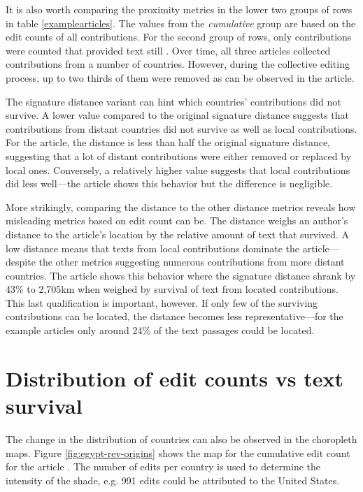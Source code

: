 It is also worth comparing the proximity metrics in the lower two groups of rows in table \ref{examplearticles}.
The values from the \emph{cumulative} group are based on the edit counts of all contributions.
For the second group of rows, only contributions were counted that provided text still .
Over time, all three articles collected contributions from a number of countries. 
However, during the collective editing process, up to two thirds of them were removed as can be observed in the  article. 

The signature distance variant  can hint which countries' contributions did not survive.
A lower  value compared to the original signature distance suggests that contributions from distant countries did not survive as well as local contributions.
For the  article, the  distance is less than half the original signature distance, suggesting that a lot of distant contributions were either removed or replaced by local ones.
Conversely, a relatively higher  value suggests that local contributions did less well---the article  shows this behavior but the difference is negligible.

More strikingly, comparing the  distance to the other distance metrics reveals how misleading metrics based on edit count can be.
The  distance weighs an author's distance to the article's location by the relative amount of text that survived.
A low  distance means that texts from local contributions dominate the article---despite the other metrics suggesting numerous contributions from more distant countries.
The  article shows this behavior where the signature distance shrank by 43\% to 2,705km when weighed by survival of text from located contributions. 
This last qualification is important, however.
If only few of the surviving contributions can be located, the  distance becomes less representative---for the example articles only around 24\% of the text passages could be located.


\section{Distribution of edit counts vs text survival}

The change in the distribution of countries can also be observed in the choropleth maps. 
Figure \ref{fig:egypt-rev-origins} shows the map for the cumulative edit count for the article .
The number of edits per country is used to determine the intensity of the shade, e.g. 991 edits could be attributed to the United States. 

